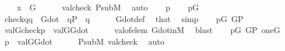 \begin{isabellebody}
\ \ \ \ {\isachardoublequoteopen}x\ {\isasymin}\ G{\isachardoublequoteclose}\isanewline
\ \ \ \ \isamarkupfalse%
\ valcheck\ P{\isacharunderscore}{\kern0pt}sub{\isacharunderscore}{\kern0pt}M\ \isamarkupfalse%
\ auto\isanewline
{}\isamarkupfalse%
\isanewline
\ \ \isamarkupfalse%
\ p\isanewline
\ \ \isamarkupfalse%
\ {\isachardoublequoteopen}p{\isasymin}G{\isachardoublequoteclose}\isanewline
\ \ \isamarkupfalse%
\ {\isachardoublequoteopen}{\isasymlangle}check{\isacharparenleft}{\kern0pt}q{\isacharparenright}{\kern0pt}{\isacharcomma}{\kern0pt}q{\isasymrangle}\ {\isasymin}\ G{\isacharunderscore}{\kern0pt}dot{\isachardoublequoteclose}\ \ {\isachardoublequoteopen}q{\isasymin}P{\isachardoublequoteclose}\ \ q\isanewline
\ \ \ \ \isamarkupfalse%
\ G{\isacharunderscore}{\kern0pt}dot{\isacharunderscore}{\kern0pt}def\ \isamarkupfalse%
\ that\ \isamarkupfalse%
\ simp\isanewline
\ \ \isamarkupfalse%
\ {\isacartoucheopen}p{\isasymin}G{\isacartoucheclose}\ {\isacartoucheopen}G{\isasymsubseteq}P{\isacartoucheclose}\isanewline
\ \ \isamarkupfalse%
\ {\isachardoublequoteopen}val{\isacharparenleft}{\kern0pt}G{\isacharcomma}{\kern0pt}check{\isacharparenleft}{\kern0pt}p{\isacharparenright}{\kern0pt}{\isacharparenright}{\kern0pt}\ {\isasymin}\ val{\isacharparenleft}{\kern0pt}G{\isacharcomma}{\kern0pt}G{\isacharunderscore}{\kern0pt}dot{\isacharparenright}{\kern0pt}{\isachardoublequoteclose}\isanewline
\ \ \ \ \isamarkupfalse%
\ val{\isacharunderscore}{\kern0pt}of{\isacharunderscore}{\kern0pt}elem\ G{\isacharunderscore}{\kern0pt}dot{\isacharunderscore}{\kern0pt}in{\isacharunderscore}{\kern0pt}M\ \isamarkupfalse%
\ blast\isanewline
\ \ \isamarkupfalse%
\ {\isacartoucheopen}p{\isasymin}G{\isacartoucheclose}\ {\isacartoucheopen}G{\isasymsubseteq}P{\isacartoucheclose}\ {\isacartoucheopen}one{\isasymin}G{\isacartoucheclose}\isanewline
\ \ \isamarkupfalse%
\ {\isachardoublequoteopen}p\ {\isasymin}\ val{\isacharparenleft}{\kern0pt}G{\isacharcomma}{\kern0pt}G{\isacharunderscore}{\kern0pt}dot{\isacharparenright}{\kern0pt}{\isachardoublequoteclose}\isanewline
\ \ \ \ \isamarkupfalse%
\ P{\isacharunderscore}{\kern0pt}sub{\isacharunderscore}{\kern0pt}M\ valcheck\ \isamarkupfalse%
\ auto\isanewline
{}\isamarkupfalse%
%
\endisatagproof
{\isafoldproof}%
%
\isadelimproof

\end{isabellebody}
